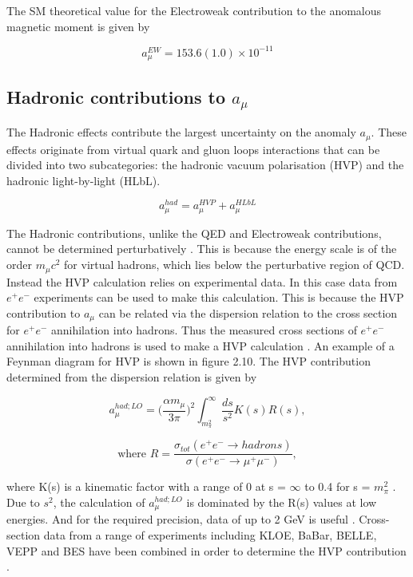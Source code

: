 The SM theoretical value for the Electroweak contribution to the anomalous magnetic moment is given by

\begin{equation}
a_{\mu}^{EW} = 153.6(1.0){\times}10^{-11}
\end{equation}

\subsection{Hadronic contributions to $a_{\mu}$}

The Hadronic effects contribute the largest uncertainty on the anomaly $a_{\mu}$. These effects originate from virtual quark and gluon loops interactions that can be divided into two subcategories: the hadronic vacuum polarisation (HVP) and the hadronic light-by-light (HLbL).

\begin{equation}
a_{\mu}^{had} = a_{\mu}^{HVP} + a_{\mu}^{HLbL}
\end{equation}

The Hadronic contributions, unlike the QED and Electroweak contributions, cannot be determined perturbatively \cite{Reference20}. This is because the energy scale is of the order $m_{\mu}c^2$ for virtual hadrons, which lies below the perturbative region of QCD. Instead the HVP calculation relies on experimental data. In this case data from ${e^+}{e^-}$ experiments can be used to make this calculation. This is because the HVP contribution to $a_{\mu}$ can be related via the dispersion relation to the cross section for ${e^+}{e^-}$ annihilation into hadrons. Thus the measured cross sections of ${e^+}{e^-}$ annihilation into hadrons is used to make a HVP calculation \cite{Reference21}. An example of a Feynman diagram for HVP is shown in figure 2.10. The HVP contribution determined from the dispersion relation is given by

\begin{equation}
a_{\mu}^{had;LO} = \Big(\frac{\alpha{m}_{\mu}}{3\pi}\Big)^{2}\int^{\infty}_{m^{2}_{\pi}} \frac{ds}{s^2}K(s)R(s), 
\end{equation}

\begin{equation}
\text{where } R = \frac{\sigma_{tot}(e^{+}e^{-} \rightarrow hadrons)}{\sigma(e^{+}e^{-} \rightarrow \mu^{+}\mu^{-})},
\end{equation}

where K(s) is a kinematic factor with a range of 0 at s = $\infty$ to 0.4 for s = $m^{2}_{\pi}$ \cite{DispersionRel}.
Due to $s^2$, the calculation of $a_{\mu}^{had;LO}$ is dominated by the R(s) values at low energies. And for the required precision, data of up to 2 GeV is useful \cite{Reference29}. Cross-section data from a range of experiments including KLOE, BaBar, BELLE, VEPP and BES have been combined in order to determine the HVP contribution \cite{Reference22}.

